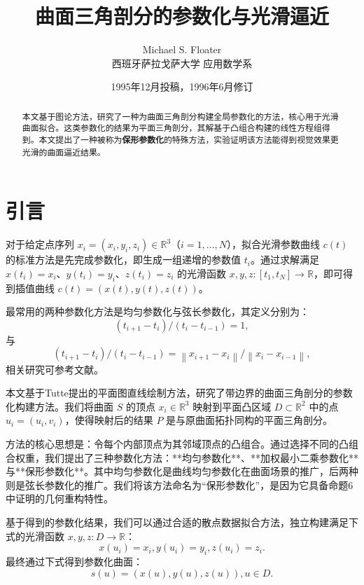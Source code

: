 \documentclass{ctexart}
\theoremstyle{proof}
\begin{document}
\title{曲面三角剖分的参数化与光滑逼近}
\author{Michael S. Floater \\ 西班牙萨拉戈萨大学 应用数学系}
\date{1995年12月投稿，1996年6月修订}
\maketitle

\begin{abstract}
本文基于图论方法，研究了一种为曲面三角剖分构建全局参数化的方法，核心用于光滑曲面拟合。这类参数化的结果为平面三角剖分，其解基于凸组合构建的线性方程组得到。本文提出了一种被称为\textbf{保形参数化}的特殊方法，实验证明该方法能得到视觉效果更光滑的曲面逼近结果。
\end{abstract}

\section{引言}
对于给定点序列 $x_{i}=(x_{i}, y_{i}, z_{i}) \in \mathbb{R}^{3}$（$i=1, ..., N$），拟合光滑参数曲线 $c(t)$ 的标准方法是先完成参数化，即生成一组递增的参数值 $t_{i}$。通过求解满足 $x(t_{i})=x_{i}$、$y(t_{i})=y_{i}$、$z(t_{i})=z_{i}$ 的光滑函数 $x, y, z:[t_{1}, t_{N}] \to \mathbb{R}$，即可得到插值曲线 $c(t)=(x(t), y(t), z(t))$。

最常用的两种参数化方法是均匀参数化与弦长参数化，其定义分别为：
\[
\left(t_{i+1}-t_{i}\right) /\left(t_{i}-t_{i-1}\right)=1,
\]
与
\[
\left(t_{i+1}-t_{i}\right) /\left(t_{i}-t_{i-1}\right)=\left\| x_{i+1}-x_{i}\right\| /\left\| x_{i}-x_{i-1}\right\| , \tag{2}
\]
相关研究可参考文献\cite{deboor1978,farin1988}。

本文基于Tutte\cite{tutte1963}提出的平面图直线绘制方法，研究了带边界的曲面三角剖分的参数化构建方法。我们将曲面 $S$ 的顶点 $x_{i} \in \mathbb{R}^{3}$ 映射到平面凸区域 $D \subset \mathbb{R}^{2}$ 中的点 $u_{i}=(u_{i}, v_{i})$，使得映射后的结果 $P$ 是与原曲面拓扑同构的平面三角剖分。

方法的核心思想是：令每个内部顶点为其邻域顶点的凸组合。通过选择不同的凸组合权重，我们提出了三种参数化方法：**均匀参数化**、**加权最小二乘参数化**与**保形参数化**。其中均匀参数化是曲线均匀参数化在曲面场景的推广，后两种则是弦长参数化的推广。我们将该方法命名为“保形参数化”，是因为它具备命题6中证明的几何重构特性。

基于得到的参数化结果，我们可以通过合适的散点数据拟合方法\cite{franke1986}，独立构建满足下式的光滑函数 $x, y, z: D \to \mathbb{R}$：
\[
x(u_{i})=x_{i}, y(u_{i})=y_{i}, z(u_{i})=z_{i}. \tag{3}
\]
最终通过下式得到参数化曲面：
\[
s(u)=(x(u),y(u),z(u)), u\in D. \tag{4}
\]
\end{document}
